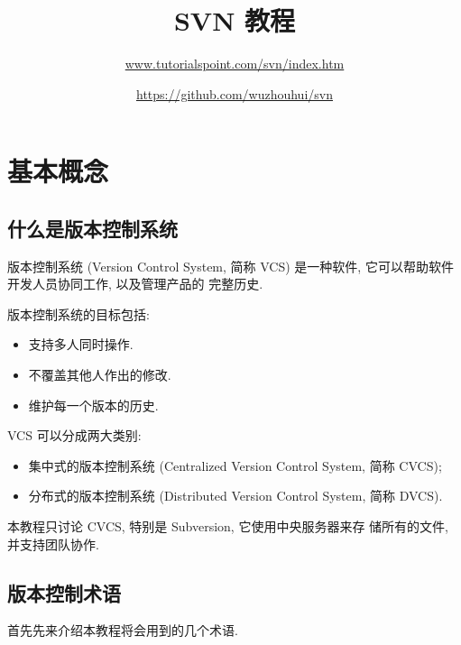 \documentclass[nofonts, oneside]{ctexbook}
\title{SVN 教程}
\author{\url{www.tutorialspoint.com/svn/index.htm} \and
	\url{https://github.com/wuzhouhui/svn}}
\begin{document}
\maketitle

\chapter{基本概念}
\label{chap:basic_concepts}

\section{什么是版本控制系统}
\label{sec:what_is_version_control_system}

版本控制系统 (Version Control System, 简称 VCS) 是一种软件, 它可以帮助软件开发人员协同工作, 以及管理产品的
完整历史.

版本控制系统的目标包括:
\begin{itemize}
  \item 支持多人同时操作.
  \item 不覆盖其他人作出的修改.
  \item 维护每一个版本的历史.
\end{itemize}

VCS 可以分成两大类别:
\begin{itemize}
  \item 集中式的版本控制系统 (Centralized Version Control System, 简称 CVCS);
  \item 分布式的版本控制系统 (Distributed Version Control System, 简称 DVCS).
\end{itemize}

本教程只讨论 CVCS, 特别是 Subversion, 它使用中央服务器来存
储所有的文件, 并支持团队协作.

\section{版本控制术语}
\label{sec:version_control_terminologies}

首先先来介绍本教程将会用到的几个术语.
\end{document}

